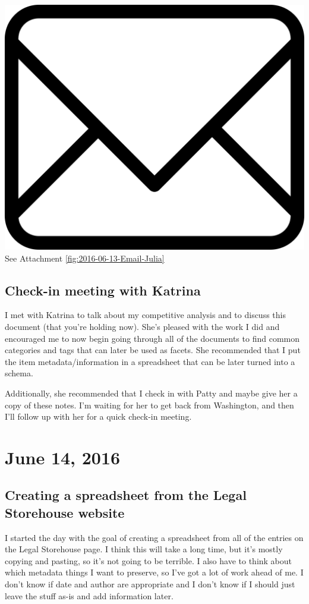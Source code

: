 \documentclass{article}
\begin{document}
\vspace{2em}
\noindent\includegraphics[height=\fontcharht\font`\B]{icons/attachment-email} See Attachment \ref{fig:2016-06-13-Email-Julia}
\vspace{2em}

\subsection{Check-in meeting with Katrina}
I met with Katrina to talk about my competitive analysis and to discuss this document (that you're holding now). She's pleased with the work I did and encouraged me to now begin going through all of the documents to find common categories and tags that can later be used as facets. She recommended that I put the item metadata/information in a spreadsheet that can be later turned into a schema. 

Additionally, she recommended that I check in with Patty and maybe give her a copy of these notes. I'm waiting for her to get back from Washington, and then I'll follow up with her for a quick check-in meeting.

\section{June 14, 2016}
\subsection{Creating a spreadsheet from the Legal Storehouse website}
I started the day with the goal of creating a spreadsheet from all of the entries on the Legal Storehouse page. I think this will take a long time, but it's mostly copying and pasting, so it's not going to be terrible. I also have to think about which metadata things I want to preserve, so I've got a lot of work ahead of me. I don't know if date and author are appropriate and I don't know if I should just leave the stuff as-is and add information later.
\end{document}
